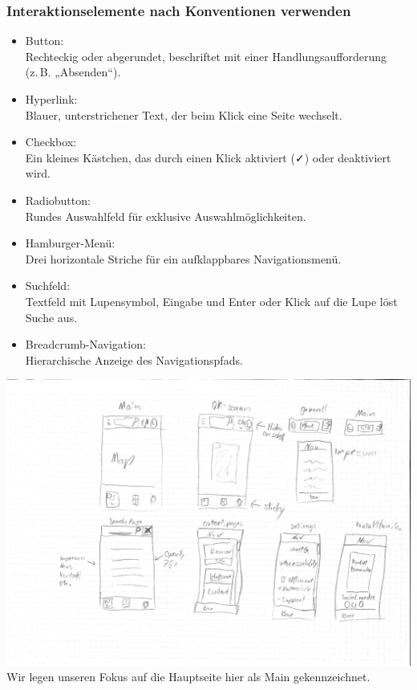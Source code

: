 \documentclass[10pt]{article}
\newcounter{subsubsubsection}[subsubsection]
\begin{document}
	\subsubsection{Interaktionselemente nach Konventionen verwenden}
	\begin{itemize}
		\item Button:\\
		Rechteckig oder abgerundet, beschriftet mit einer Handlungsaufforderung (z. B. „Absenden“).
		\item Hyperlink:\\
		Blauer, unterstrichener Text, der beim Klick eine Seite wechselt.
		\item Checkbox:\\
		Ein kleines Kästchen, das durch einen Klick aktiviert (✓) oder deaktiviert wird.
		\item Radiobutton:\\
		Rundes Auswahlfeld für exklusive Auswahlmöglichkeiten.
		\item Hamburger-Menü:\\
		Drei horizontale Striche für ein aufklappbares Navigationsmenü.
		\item Suchfeld:\\
		Textfeld mit Lupensymbol, Eingabe und Enter oder Klick auf die Lupe löst Suche aus.
		\item Breadcrumb-Navigation:\\
		Hierarchische Anzeige des Navigationspfads.
	\end{itemize}
	\includegraphics[width=17cm]{scribles-2-1}
	\\Wir legen unseren Fokus auf die Hauptseite hier als Main gekennzeichnet.\\
\end{document}
